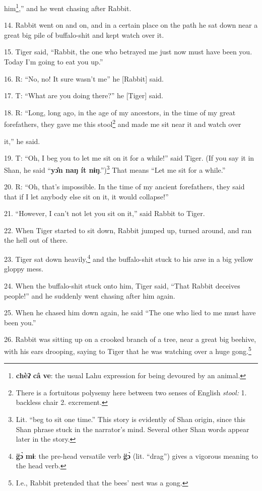 him\footnote{\textbf{chèʔ} \textbf{câ} \textbf{ve}: the usual Lahu expression for being devoured by an animal.},'' and he went chasing after Rabbit.




14. Rabbit went on and on, and in a certain place on the path he
sat down near a great big pile of buffalo-shit and kept watch over it.


15. Tiger said, ``Rabbit, the one who betrayed me just now must have been you.
Today I'm going to eat you up.''

16. R: ``No, no! It sure wasn't me'' he [Rabbit] said.

17. T: ``What are you doing there?'' he [Tiger] said.

18. R: ``Long, long ago, in the age of my ancestors, in the time of my
great forefathers, they gave me this stool\footnote{There is a fortuitous polysemy here between two senses of English \textit{stool: }1. backless chair 2. excrement.} and made me sit near it and watch
over

it,'' he said.

19. T: ``Oh, I beg you to let me sit on it for a while!'' said Tiger. (If you say
it in Shan, he said ``\textbf{yɔ̂n naŋ ít nɨŋ}.'')\footnote{Lit. ``beg to sit one time.'' This story is evidently of Shan origin, since this Shan phrase stuck in the narrator's mind. Several other Shan words appear later in the story.} That means ``Let me
sit for a while.''

20. R: ``Oh, that's impossible. In the time of my ancient forefathers, they said
that if I let anybody else sit on it, it would collapse!''

21. ``However, I can't not let you sit on it,'' said Rabbit to Tiger.

22. When Tiger started to sit down, Rabbit jumped up, turned around, and ran the
hell out of there.

23. Tiger sat down heavily,\footnote{\textbf{g̈ɔ̀} \textbf{mɨ}: the pre-head versatile verb \textbf{g̈ɔ̀} (lit. ``drag'') gives a vigorous meaning to the head verb.} and the buffalo-shit stuck to his arse in a big
yellow gloppy mess.

24. When the buffalo-shit stuck onto him, Tiger said, ``That Rabbit deceives people!''
and he suddenly went chasing after him again.

25. When he chased him down again, he said ``The one who lied to me must have been
you.''

26. Rabbit was sitting up on a crooked branch of a tree, near a great big beehive,
with his ears drooping, saying to Tiger that he was watching over a huge gong.\footnote{I.e., Rabbit pretended that the bees' nest was a gong.}

